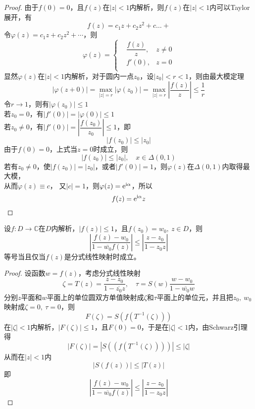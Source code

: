 \begin{proof}
    
        
    由于$f(0) = 0$，且$f(z)$在$|z| < 1$内解析，则$f(z)$在$|z|<1$内可以\textup{Taylor}展开，有
    $$f(z) = c_1 z + c_2 z^2 + c\dots + $$
    令$\varphi(z) =  c_1 z + c_2 z^2 + \cdots $，则
    $$
    \varphi(z) = 
    \left\{
        \begin{aligned}
            &\dfrac{f(z)}{z}, & z \neq 0\\
            &f'(0), & z = 0\\
        \end{aligned}
    \right.
    $$
    显然$\varphi(z)$在$|z| < 1$内解析，对于圆内一点$z_0$，设$|z_0| < r < 1$，则由最大模定理
    $$|\varphi(z+0)| = \max_{|z| = r}|\varphi(z_0)| = \max_{|z| = r}{\left| \dfrac{f(z)}{z}\right|} \leq \dfrac{1}{r}$$
    令$r \to 1$，则有$|\varphi(z_0)| \leq 1$\\
    若$z_0 = 0$，有$|f'(0)| = |\varphi(0)| \leq 1$\\
    若$z_0 \neq 0$，有$|f'(0)| = \left| \dfrac{f(z_0)}{z_0} \right| \leq 1$，即
    $$|f(z_0)| \leq |z_0|$$
    由于$f(0) = 0$，上式当$z=0$时成立，则
    $$|f(z_0)| \leq |z_0|,\quad x\in \Delta(0,1)$$
    若有$z_0 \neq 0$，使$|f(z_0)| = |z_0| $，或者$|f'(0)| = 1$，则$\varphi(z)$在$\Delta(0,1)$内取得最大模，\\
    从而$\varphi(z) \equiv c$， 又$|c| = 1$，则$\varphi(z) = \mathrm{e}^{\mathrm{i}\alpha}$，所以
    $$f(z) = \mathrm{e}^{\mathrm{i}\alpha}z$$

\end{proof}

\begin{theorem}

    设$f:D\to\mathbb{C}$在$D$内解析，$|f(z)| \leq 1$，且$f(z_0) = w_0,\ z\in D$，则
    $$ \left| \dfrac{f(z)-w_0}{1-\overline{w_0}f(z)}\right| \leq \left| \dfrac{z-z_0}{1 - z_0z}\right|$$
    等号当且仅当$f(z)$是分式线性映射时成立。

\end{theorem}

\begin{proof}
    
    设函数$w =f(z)$，考虑分式线性映射
    $$\zeta = T(z) = \dfrac{z - z_0}{1 - \overline{z_0}z},\quad \tau = S(w) \dfrac{w - w_0}{1 - \overline{w_0}w}$$
    分别$z$平面和$w$平面上的单位圆双方单值映射成$\zeta$和$\tau$平面上的单位元，并且把$z_0,\ w_0$映射成$\zeta = 0,\ \tau = 0$，则
    $$F(\zeta) = S(f(T^{-1}(\zeta)))$$
    在$|\zeta| < 1$内解析，$|F(\zeta)| \leq 1$，且$F(0) = 0$，于是在$|\zeta| < 1$内，由\textup{Schwarz}引理得
    $$|F(\zeta)| = |S((f(T^{-1}(\zeta))))| \leq |\zeta|$$
    从而在$|z|<1$内
    $$|S(f(z))| \leq |T(z)|$$
    即
    $$ \left| \dfrac{f(z)-w_0}{1-\overline{w_0}f(z)}\right| \leq \left| \dfrac{z-z_0}{1 - z_0z}\right|$$
    
\end{proof}